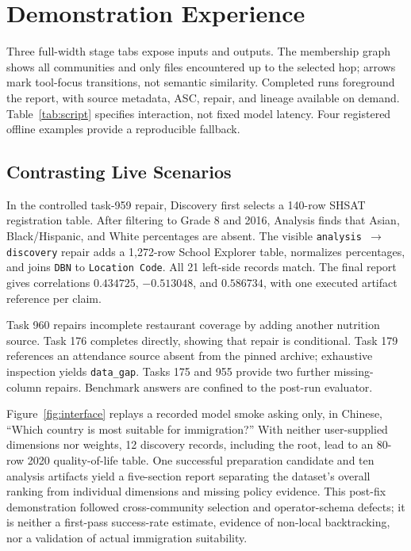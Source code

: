 \documentclass[sigconf, nonacm]{acmart}
\begin{document}
\section{Demonstration Experience}

Three full-width stage tabs expose inputs and outputs.  The membership graph
shows all communities and only files encountered up to the selected hop;
arrows mark tool-focus transitions, not semantic similarity.  Completed runs
foreground the report, with source metadata, ASC, repair, and lineage available
on demand. Table~\ref{tab:script} specifies interaction, not fixed model latency.
Four registered offline examples provide a reproducible fallback.

\subsection{Contrasting Live Scenarios}

In the controlled task-959 repair, Discovery first selects a 140-row
SHSAT registration table.  After filtering to Grade 8 and 2016, Analysis finds
that Asian, Black/Hispanic, and White percentages are absent.  The visible
\texttt{analysis $\rightarrow$ discovery} repair adds a 1,272-row School
Explorer table, normalizes percentages, and joins \texttt{DBN} to
\texttt{Location Code}.  All 21 left-side records match.  The final report gives
correlations $0.434725$, $-0.513048$, and $0.586734$, with one executed artifact
reference per claim.

Task 960 repairs incomplete restaurant coverage by adding another nutrition
source.  Task 176 completes directly, showing that repair is conditional.
Task 179 references an attendance source absent from the pinned archive;
exhaustive inspection yields \texttt{data\_gap}.  Tasks 175 and 955 provide
two further missing-column repairs.  Benchmark answers are confined to the
post-run evaluator.

Figure~\ref{fig:interface} replays a recorded model smoke asking only, in Chinese, ``Which country is most
suitable for immigration?''  With neither user-supplied dimensions nor weights,
12 discovery records, including the root, lead to an 80-row 2020 quality-of-life
table.  One successful preparation candidate and ten analysis artifacts yield
a five-section report separating the dataset's overall ranking from individual
dimensions and missing policy evidence.  This post-fix demonstration followed
cross-community selection and operator-schema defects; it is neither a
first-pass success-rate estimate, evidence of non-local backtracking, nor a
validation of actual immigration suitability.
\end{document}
